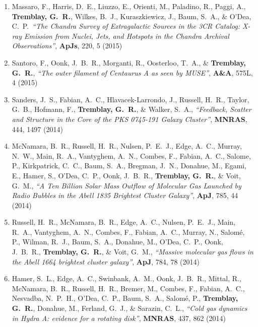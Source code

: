 \documentclass[11pt]{article}
\begin{document}
\begin{enumerate}[resume]
\item Massaro, F., Harris, D.~E., Liuzzo, E., Orienti, M., Paladino, R., Paggi, A., \textbf{Tremblay, G.~R.}, Wilkes, B.~J., Kuraszkiewicz, J., Baum, S.~A., \& O'Dea, C.~P.\ \textit{``The Chandra Survey of Extragalactic Sources in the 3CR Catalog: X-ray Emission from Nuclei, Jets, and Hotspots in the Chandra Archival Observations''}, \textbf{ApJs}, 220, 5 (2015)


\item Santoro, F., Oonk, J.~B.~R., Morganti, R., Oosterloo, T.~A., \& \textbf{Tremblay, G.~R.},  \textit{``The outer filament of Centaurus A as seen by MUSE''}, \textbf{A\&A}, 575L, 4 (2015)


\item Sanders, J.~S., Fabian, A.~C., Hlavacek-Larrondo, J., Russell, H.~R., Taylor, G.~B., Hofmann, F., \textbf{Tremblay, G.~R.}, \& Walker, S.~A.,  \textit{``Feedback, Scatter and Structure in the Core of the PKS 0745-191 Galaxy Cluster''}, \textbf{MNRAS}, 444, 1497 (2014)


\item McNamara, B.~R., Russell, H.~R., Nulsen, P.~E.~J., Edge, A.~C., Murray,
N.~W., Main, R.~A., Vantyghem, A.~N., Combes, F., Fabian, A.~C., Salome,
P., Kirkpatrick, C.~C., Baum, S.~A., Bregman, J.~N., Donahue, M., Egami,
E., Hamer, S., O'Dea, C.~P., Oonk, J.~B.~R., \textbf{Tremblay, G.~R.},
\& Voit, G.~M., \textit{``A Ten Billion Solar Mass Outflow of Molecular Gas Launched by Radio Bubbles in the Abell 1835 Brightest Cluster Galaxy''}, \textbf{ApJ}, 785, 44 (2014)


\item Russell, H.~R., McNamara, B.~R., Edge, A.~C., Nulsen, P.~E.~J., Main,
R.~A., Vantyghem, A.~N., Combes, F., Fabian, A.~C., Murray, N., Salom\'{e}, P.,
Wilman, R.~J., Baum, S.~A., Donahue, M., O'Dea, C.~P., Oonk, J.~B.~R.,
\textbf{Tremblay, G.~R.},
\& Voit, G.~M.,  \textit{``Massive molecular gas flows in the Abell 1664 brightest cluster galaxy''}, \textbf{ApJ}, 784, 78 (2014)



\item Hamer, S.~L., Edge, A.~C., Swinbank, A.~M., Oonk, J.~B.~R., Mittal, R., McNamara, B.~R., Russell, H.~R., Bremer, M., Combes, F., Fabian, A.~C., Nesvadba, N.~P.~H., O'Dea, C.~P., Baum, S.~A., Salom\'{e}, P., \textbf{Tremblay, G.~R.}, Donahue, M., Ferland, G.~J., \& Sarazin, C.~L.,  \textit{``Cold gas dynamics in Hydra A: evidence for a rotating disk''}, \textbf{MNRAS}, 437, 862 (2014)





\end{enumerate}
\end{document}
